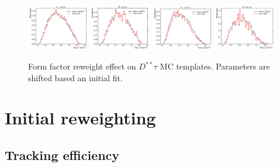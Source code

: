 \begin{figure}[ht]
    \includegraphics[width=0.24\textwidth]{
        ./figs-mc-correction/reweighting-form-factors/DststTau/D1stst0Tau.pdf
    }
    \includegraphics[width=0.24\textwidth]{
        ./figs-mc-correction/reweighting-form-factors/DststTau/D1ststTau.pdf
    }
    \includegraphics[width=0.24\textwidth]{
        ./figs-mc-correction/reweighting-form-factors/DststTau/D2stst0Tau.pdf
    }
    \includegraphics[width=0.24\textwidth]{
        ./figs-mc-correction/reweighting-form-factors/DststTau/D2ststTau.pdf
    }

    \caption{
        Form factor reweight effect on $D^{**}\tau$ MC templates.
        Parameters are shifted based an initial fit.
    }
    \label{fig:ff-rwt-Dstst-sig-like}
\end{figure}


\section{Initial reweighting}
\label{sec:data-mc:init-rwt}

\subsection{Tracking efficiency}

